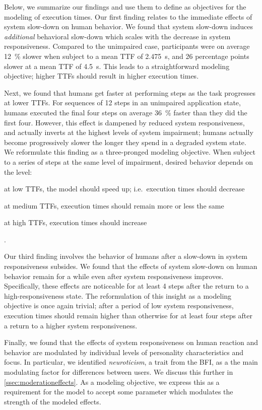 Below, we summarize our findings and use them to define as objectives for the modeling of execution times.
Our first finding relates to the immediate effects of system slow-down on human behavior.
We found that system slow-down induces \emph{additional} behavioral slow-down which scales with the decrease in system responsiveness.
Compared to the unimpaired case, participants were on average \SI{12}{\percent} slower when subject to a mean \gls{TTF} of \SI{2.475}{\second}, and \num{26} percentage points slower at a mean \gls{TTF} of \SI{4.5}{\second}.
This leads to a straightforward modeling objective; higher \glspl{TTF} should result in higher execution times.

Next, we found that humans get faster at performing steps as the task progresses at lower \glspl{TTF}.
For sequences of \num{12} steps in an unimpaired application state, humans executed the final four steps on average \SI{36}{\percent} faster than they did the first four.
However, this effect is dampened by reduced system responsiveness, and actually inverts at the highest levels of system impairment;
humans actually become progressively slower the longer they spend in a degraded system state.
We reformulate this finding as a three-pronged modeling objective.
When subject to a series of steps at the same level of impairment, desired behavior depends on the level:
\begin{enumerate*}[itemjoin={{; }}, itemjoin*={{; and }}]
    \item at low \glspl{TTF}, the model should speed up; i.e.\ execution times should decrease
    \item at medium \glspl{TTF}, execution times should remain more or less the same
    \item at high \glspl{TTF}, execution times should increase
\end{enumerate*}.

Our third finding involves the behavior of humans after a slow-down in system responsiveness subsides.
We found that the effects of system slow-down on human behavior remain for a while even after system responsiveness improves.
Specifically, these effects are noticeable for at least \num{4} steps after the return to a high-responsiveness state.
The reformulation of this insight as a modeling objective is once again trivial; after a period of low system responsiveness, execution times should remain higher than otherwise for at least four steps after a return to a higher system responsiveness.

Finally, we found that the effects of system responsiveness on human reaction and behavior are modulated by individual levels of personality characteristics and focus.
In particular, we identified \emph{neuroticism}, a trait from the \gls{BFI}, as a the main modulating factor for differences between users.
We discuss this further in \cref{ssec:moderationeffects}.
As a modeling objective, we express this as a requirement for the model to accept some parameter which modulates the strength of the modeled effects.

